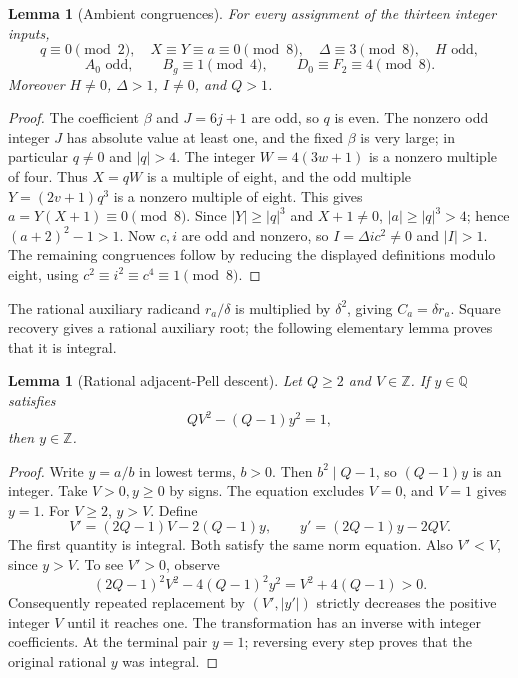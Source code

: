 \documentclass[11pt]{article}
\newcommand{\Z}{\mathbb Z}
\newcommand{\Q}{\mathbb Q}
\newtheorem{lemma}[theorem]{Lemma}
\theoremstyle{remark}
\begin{document}
\begin{lemma}[Ambient congruences]\label{lem:ambient}
For every assignment of the thirteen integer inputs,
\[
 q\equiv0\pmod2,\quad X\equiv Y\equiv a\equiv0\pmod8,\quad
 \Delta\equiv3\pmod8,\quad H\text{ odd},
\]
\[
 A_0\text{ odd},\qquad B_g\equiv1\pmod4,\qquad
 D_0\equiv F_2\equiv4\pmod8.
\]
Moreover \(H\ne0\), \(\Delta>1\), \(I\ne0\), and \(Q>1\).
\end{lemma}
\begin{proof}
The coefficient \(\beta\) and \(J=6j+1\) are odd, so \(q\) is even.
The nonzero odd integer \(J\) has absolute value at least one, and the
fixed \(\beta\) is very large; in particular \(q\ne0\) and \(|q|>4\).
The integer \(W=4(3w+1)\) is a nonzero multiple of four.
Thus \(X=qW\) is a multiple of eight, and the odd multiple
\(Y=(2v+1)q^3\) is a nonzero multiple of eight.
This gives \(a=Y(X+1)\equiv0\pmod8\).
Since \(|Y|\ge|q|^3\) and \(X+1\ne0\), \(|a|\ge|q|^3>4\);
hence \((a+2)^2-1>1\).
Now \(c,i\) are odd and nonzero, so \(I=\Delta i c^2\ne0\) and
\(|I|>1\).
The remaining congruences follow by reducing the displayed definitions
modulo eight, using \(c^2\equiv i^2\equiv c^4\equiv1\pmod8\).
\end{proof}

The rational auxiliary radicand \(r_a/\delta\) is multiplied by \(\delta^2\), giving \(C_a=\delta r_a\).
Square recovery gives a rational auxiliary root; the following elementary
lemma proves that it is integral.

\begin{lemma}[Rational adjacent-Pell descent]\label{lem:descent}
Let \(Q\ge2\) and \(V\in\Z\). If \(y\in\Q\) satisfies
\[
 QV^2-(Q-1)y^2=1,
\]
then \(y\in\Z\).
\end{lemma}
\begin{proof}
Write \(y=a/b\) in lowest terms, \(b>0\).
Then \(b^2\mid Q-1\), so \((Q-1)y\) is an integer.
Take \(V>0,y\ge0\) by signs. The equation excludes \(V=0\), and
\(V=1\) gives \(y=1\).
For \(V\ge2\), \(y>V\). Define
\[
 V'=(2Q-1)V-2(Q-1)y,\qquad
 y'=(2Q-1)y-2QV.
\]
The first quantity is integral. Both satisfy the same norm equation.
Also \(V'<V\), since \(y>V\). To see \(V'>0\), observe
\[
 (2Q-1)^2V^2-4(Q-1)^2y^2=V^2+4(Q-1)>0.
\]
Consequently repeated replacement by \((V',|y'|)\) strictly decreases
the positive integer \(V\) until it reaches one.
The transformation has an inverse with integer coefficients.
At the terminal pair \(y=1\); reversing every step proves that the
original rational \(y\) was integral.
\end{proof}
\end{document}
